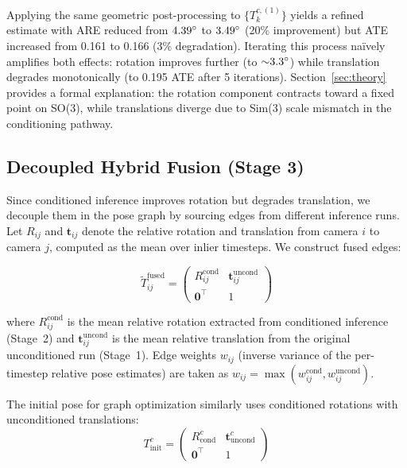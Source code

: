 Applying the same geometric post-processing to $\{T_k^{c,(1)}\}$ yields a refined estimate with ARE reduced from $4.39\degree$ to $3.49\degree$ (20\% improvement) but ATE increased from 0.161 to 0.166 (3\% degradation). Iterating this process na\"ively amplifies both effects: rotation improves further (to ${\sim}3.3\degree{}$) while translation degrades monotonically (to 0.195 ATE after 5 iterations). Section~\ref{sec:theory} provides a formal explanation: the rotation component contracts toward a fixed point on SO(3), while translations diverge due to Sim(3) scale mismatch in the conditioning pathway.

\subsection{Decoupled Hybrid Fusion (Stage 3)}
\label{sec:stage3}

Since conditioned inference improves rotation but degrades translation, we decouple them in the pose graph by sourcing edges from different inference runs. Let $R_{ij}$ and $\mathbf{t}_{ij}$ denote the relative rotation and translation from camera $i$ to camera $j$, computed as the mean over inlier timesteps. We construct fused edges:

\begin{equation}
    \tilde{T}_{ij}^{\text{fused}} = \begin{pmatrix} R_{ij}^{\text{cond}} & \mathbf{t}_{ij}^{\text{uncond}} \\ \mathbf{0}^\top & 1 \end{pmatrix}
\end{equation}

where $R_{ij}^{\text{cond}}$ is the mean relative rotation extracted from conditioned inference (Stage~2) and $\mathbf{t}_{ij}^{\text{uncond}}$ is the mean relative translation from the original unconditioned run (Stage~1). Edge weights $w_{ij}$ (inverse variance of the per-timestep relative pose estimates) are taken as $w_{ij} = \max(w_{ij}^{\text{cond}}, w_{ij}^{\text{uncond}})$.

The initial pose for graph optimization similarly uses conditioned rotations with unconditioned translations:
\begin{equation}
    T_{\text{init}}^c = \begin{pmatrix} R_{\text{cond}}^c & \mathbf{t}_{\text{uncond}}^c \\ \mathbf{0}^\top & 1 \end{pmatrix}
\end{equation}

